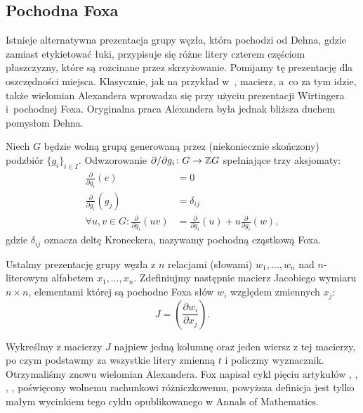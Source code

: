 \subsection{Pochodna Foxa}
Istnieje alternatywna prezentacja grupy węzła, która pochodzi od Dehna, gdzie zamiast etykietować łuki, przypisuje się różne litery czterem częściom płaszczyzny, które są rozcinane przez skrzyżowanie.
Pomijamy tę prezentację dla oszczędności miejsca.
Klasycznie, jak na przykład w~\cite{crowell63}, macierz, a~co za tym idzie, także wielomian Alexandera wprowadza się przy użyciu prezentacji Wirtingera i~pochodnej Foxa.
Oryginalna praca Alexandera była jednak bliższa duchem pomysłom Dehna.

\begin{definition}
    Niech $G$ będzie wolną grupą generowaną przez (niekoniecznie skończony) podzbiór $\{g_i\}_{i \in I}$.
    Odwzorowanie $\partial/\partial g_i \colon G \to \mathbb Z G$ spełniające trzy aksjomaty:
    \begin{align}
        \frac{\partial}{\partial g_i} (e) & = 0 \\
        \frac{\partial}{\partial g_i} (g_j) & = \delta_{ij} \\
        \forall u, v \in G : \frac{\partial}{\partial g_i} (uv) & = \frac{\partial}{\partial g_i}(u) + u \frac{\partial}{\partial g_i} (w),
    \end{align}
    gdzie $\delta_{ij}$ oznacza deltę Kroneckera, nazywamy pochodną cząstkową Foxa.
\end{definition}

Ustalmy prezentację grupy węzła z $n$ relacjami (słowami) $w_1, \ldots, w_n$ nad $n$-literowym alfabetem $x_1, \ldots, x_n$.
Zdefiniujmy następnie macierz Jacobiego wymiaru $n \times n$, elementami której są pochodne Foxa słów $w_i$ względem zmiennych $x_j$:
\begin{equation}
    J = \left(\frac{\partial w_i}{\partial x_j}\right).
\end{equation}

Wykreślmy z macierzy $J$ najpiew jedną kolumnę oraz jeden wiersz z tej macierzy, po czym podstawmy za wszystkie litery zmienną $t$ i policzmy wyznacznik.
Otrzymaliśmy znowu wielomian Alexandera.
Fox napisał cykl pięciu artykułów \cite{fox53}, \cite{fox54}, \cite{fox56}, \cite{fox58}, \cite{fox60} poświęcony wolnemu rachunkowi różniczkowemu, powyższa definicja jest tylko małym wycinkiem tego cyklu opublikowanego w Annals of Mathematics.
